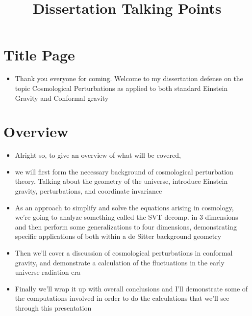 \documentclass[10pt,letterpaper]{article}
\title{Dissertation Talking Points}
\date{}
\numberwithin{equation}{section}
\begin{document}
 
\maketitle
\noindent 


\section{Title Page}
\begin{itemize}
	\item Thank you everyone for coming. Welcome to my dissertation defense on the topic Cosmological Perturbations as applied to both standard Einstein Gravity and Conformal gravity
\end{itemize}



\section{Overview}
\begin{itemize}
	\item Alright so, to give an overview of what will be covered,
	\item we will first form the necessary background of cosmological perturbation theory. Talking about the geometry of the universe, introduce Einstein gravity, perturbations, and coordinate invariance
	\item As an approach to simplify and solve the equations arising in cosmology, we're going to analyze something called the SVT decomp. in 3 dimensions and then perform some generalizations to four dimensions, demonstrating specific applications of both within a de Sitter background geometry
	\item Then we'll cover a discussion of cosmological perturbations in conformal gravity, and demonstrate a calculation of the fluctuations in the early universe radiation era
	\item Finally we'll wrap it up with overall conclusions and I'll demonstrate some of the computations involved in order to do the calculations that we'll see through this presentation
\end{itemize}

\end{document}
